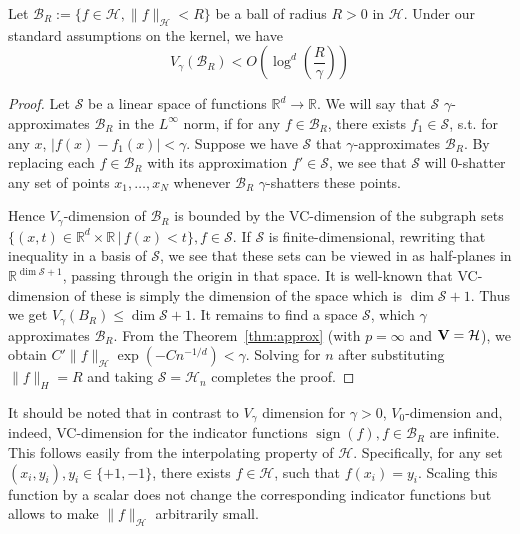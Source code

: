 \documentclass[final,12pt]{colt2018}
\renewcommand{\H}{\mathcal{H}}
\renewcommand{\S}{{\mathcal S}}
\newcommand{\R}{\mathbb{R}}
\newcommand{\Br}{\mathcal{B}_R}
\DeclareMathOperator{\sign}{sign}
\begin{document}
\begin{theorem}\label{thm:vgamma} Let $\Br:=\{f \in \H,  \|f\|_\H < R\}$ be a ball of radius $R>0$ in $\H$. Under  our standard assumptions on the kernel, we have
\begin{equation}\label{eq:vgamma}
V_\gamma (\Br) < O\left(\log^d\left(\frac{R}{\gamma}\right)\right)
\end{equation}
\end{theorem}
\begin{proof}
Let  $\S$ be a linear space of functions  $\R^d\to \R$. We will say that $\S$   $\gamma$-approximates $\Br$ in the $L^\infty$ norm, if for any $f \in \Br$, there exists $f_1\in \S$, s.t. for any $x$, $|f(x) - f_1(x) | < \gamma$.  Suppose we have  $\S$ that $\gamma$-approximates $\Br$.
By replacing each $f \in \Br$ with its approximation $f' \in \S$, we see that $\S$ will 0-shatter any set of points 
$x_1,\ldots,x_N$ whenever  $\Br$ $\gamma$-shatters  these points.  

Hence $V_\gamma$-dimension of $\Br$ is bounded by the VC-dimension of the subgraph sets  $\{(x,t) \in \R^d\times\R \,| \,f(x) < t\}, f \in \S$. If $\S$ is finite-dimensional, rewriting that inequality in a basis of $\S$, we see that these sets can be viewed in as half-planes in $\R^{\dim \S +1}$,  passing through the origin in that space. It is well-known that VC-dimension of these is simply the dimension of the space which is $\dim \S +1$. Thus we get 
 $
V_\gamma(B_R) \le \dim \S+1
$.
It remains to find a space $\S$, which $\gamma$ approximates $\Br$. From the Theorem~\ref{thm:approx} (with $p=\infty$ and $\bf V = \H$), we obtain
$
C' \|f\|_\H \exp (-Cn^{-1/d}) < \gamma
$.
Solving for $n$ after substituting $\|f\|_H=R$ and taking $\S = \H_n$ completes the proof.
\end{proof}
\begin{remark}
 It should be noted that in contrast to $V_\gamma$ dimension for $\gamma>0$, $V_0$-dimension and, indeed, 
 VC-dimension for the indicator functions $\sign (f), f \in \Br$ are infinite. This follows easily from the interpolating property of $\H$. 
Specifically, for any set $(x_i, y_i), y_i \in \{+1,-1\}$, there exists $f \in \H$, such that $f(x_i) = y_i$.  Scaling this function by a scalar does not change the corresponding indicator functions but allows to make $\|f\|_\H$ arbitrarily small.  %
\end{remark}
\end{document}
